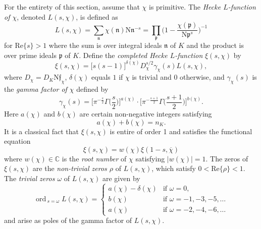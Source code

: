 \documentclass[12pt,psamsfonts]{amsart}
\theoremstyle{definition}
\theoremstyle{remark}
\numberwithin{equation}{section}
\theoremstyle{plain}
\theoremstyle{remark}
\renewcommand{\1}{ {\bf 1}}
\renewcommand{\bar}{\overline}
\newcommand{\kf}{\mathfrak{f}}
\newcommand{\kn}{\mathfrak{n}}
\newcommand{\N}{\mathrm{N}}
\newcommand{\kp}{\mathfrak{p}}
\newcommand{\ord}{\mathrm{ord}\,}
\renewcommand{\Re}{\mathrm{Re}}
\begin{document}
For the entirety of this section, assume that $\chi$ is primitive. The \emph{Hecke $L$-function of $\chi$}, denoted $L(s, \chi)$, is defined as 
\begin{equation}
L(s,\chi) = \sum_{\kn} \chi(\kn) \N\kn^{-s} = \prod_{\kp} \Big(1-\frac{\chi(\kp)}{\N\kp^{s} } \Big)^{-1}
\label{def:Hecke_L-fcn}
\end{equation}
for $\Re\{s\} > 1$ where the sum is over integral ideals $\kn$ of $K$ and the product is over prime ideals $\kp$ of $K$. Define the \emph{completed Hecke $L$-function} $\xi(s, \chi)$ by
\begin{equation}
\xi(s, \chi) = \big[ s(s-1) \big]^{\delta(\chi)} D_{\chi}^{s/2} \gamma_{\chi}(s) L(s, \chi),
\label{def:CompletedHecke}
\end{equation}
where $D_{\chi} = D_K \N\kf_{\chi}$, $\delta(\chi)$ equals $1$ if $\chi$ is trivial and $0$ otherwise, and $\gamma_{\chi}(s)$ is the \emph{gamma factor of $\chi$} defined by
\begin{equation}
\gamma_{\chi}(s) =  \Big[ \pi^{-\tfrac{s}{2}} \Gamma\Big(\frac{s}{2}\Big)  \Big]^{a(\chi)} \cdot \Big[ \pi^{-\tfrac{s+1}{2} } \Gamma\Big( \frac{s+1}{2} \Big)   \Big]^{b(\chi)}.
\label{GammaFactor} 
\end{equation}
Here $a(\chi)$ and $b(\chi)$ are certain non-negative integers satisfying 
\begin{equation}
a(\chi) + b(\chi) = n_K. 
\label{GammaFactor_Exponents}
\end{equation}
It is a classical fact that $\xi(s, \chi)$ is entire of order 1 and satisfies the functional equation
\begin{equation}
\xi(s, \chi) = w(\chi) \xi(1-s, \bar{\chi})
\label{FunctionalEquation}
\end{equation}
where $w(\chi) \in \mathbb{C}$ is the \emph{root number} of $\chi$ satisfying $|w(\chi)| = 1$. 
The zeros of $\xi(s,\chi)$ are the \emph{non-trivial zeros $\rho$} of $L(s,\chi)$, which satisfy $0 < \Re\{\rho\} < 1$.  The \emph{trivial zeros $\omega$} of $L(s, \chi)$ are given by 
\begin{equation}
\mathop{\ord}_{s = \omega} L(s, \chi) = 
\begin{cases}
a(\chi) - \delta(\chi) & \text{if } \omega = 0, \\
b(\chi) &  \text{if } \omega = -1,-3,-5,\dots\\
a(\chi) & \text{if } \omega = -2,-4,-6, \dots
\end{cases}
\label{TrivialZeros}
\end{equation}
and arise as poles of the gamma factor of $L(s,\chi)$. 
\end{document}
